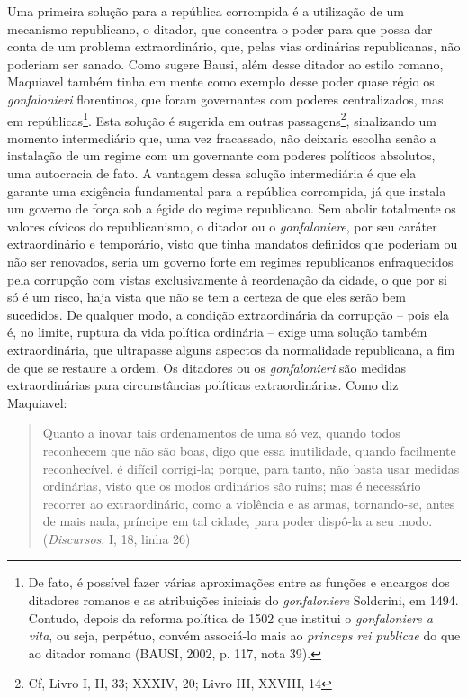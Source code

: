 Uma primeira solução para a república corrompida é a utilização de um
mecanismo republicano, o ditador, que concentra o poder para que possa
dar conta de um problema extraordinário, que, pelas vias ordinárias
republicanas, não poderiam ser sanado. Como sugere Bausi, além desse
ditador ao estilo romano, Maquiavel também tinha em mente como exemplo
desse poder quase régio os \emph{gonfalonieri} florentinos, que foram
governantes com poderes centralizados, mas em repúblicas\footnote{De
  fato, é possível fazer várias aproximações entre as funções e encargos
  dos ditadores romanos e as atribuições iniciais do \emph{gonfaloniere}
  Solderini, em 1494. Contudo, depois da reforma política de 1502 que
  institui o \emph{gonfaloniere a vita}, ou seja, perpétuo, convém
  associá-lo mais ao \emph{princeps rei publicae} do que ao ditador
  romano (BAUSI, 2002, p. 117, nota 39).}. Esta solução é sugerida em
outras passagens\footnote{Cf, Livro I, II, 33; XXXIV, 20; Livro III,
  XXVIII, 14}, sinalizando um momento intermediário que, uma vez
fracassado, não deixaria escolha senão a instalação de um regime com um
governante com poderes políticos absolutos, uma autocracia de fato. A
vantagem dessa solução intermediária é que ela garante uma exigência
fundamental para a república corrompida, já que instala um governo de
força sob a égide do regime republicano. Sem abolir totalmente os
valores cívicos do republicanismo, o ditador ou o \emph{gonfaloniere},
por seu caráter extraordinário e temporário, visto que tinha mandatos
definidos que poderiam ou não ser renovados, seria um governo forte em
regimes republicanos enfraquecidos pela corrupção com vistas
exclusivamente à reordenação da cidade, o que por si só é um risco, haja
vista que não se tem a certeza de que eles serão bem sucedidos. De
qualquer modo, a condição extraordinária da corrupção -- pois ela é, no
limite, ruptura da vida política ordinária -- exige uma solução também
extraordinária, que ultrapasse alguns aspectos da normalidade
republicana, a fim de que se restaure a ordem. Os ditadores ou os
\emph{gonfalonieri} são medidas extraordinárias para circunstâncias
políticas extraordinárias. Como diz Maquiavel:

\begin{quote}
Quanto a inovar tais ordenamentos de uma só vez, quando todos reconhecem
que não são boas, digo que essa inutilidade, quando facilmente
reconhecível, é difícil corrigi-la; porque, para tanto, não basta usar
medidas ordinárias, visto que os modos ordinários são ruins; mas é
necessário recorrer ao extraordinário, como a violência e as armas,
tornando-se, antes de mais nada, príncipe em tal cidade, para poder
dispô-la a seu modo. (\emph{Discursos}, I, 18, linha 26)
\end{quote}

